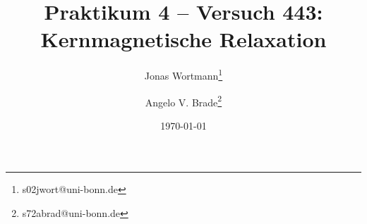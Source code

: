 \documentclass[10pt]{article}
\title{Praktikum 4 -- Versuch 443: Kernmagnetische Relaxation}
\author[1]{Jonas Wortmann\thanks{s02jwort@uni-bonn.de}}
\author[1]{Angelo V. Brade\thanks{s72abrad@uni-bonn.de}}
\affil[1]{Rheinische Friedrich-Wilhelms-Universität Bonn}
\date{\today}
\begin{document}
\maketitle
\newpage

\tableofcontents
\newpage


\pagestyle{fancy}
\fancyhead[R]{\thepage}
\fancyhead[L]{\leftmark}


\begin{multicols}{2}


\end{multicols}
\end{document}
